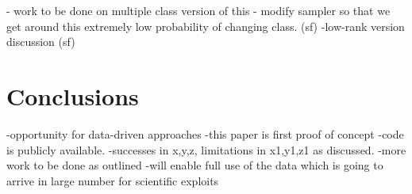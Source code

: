 \documentclass[a4paper,fleqn,usenatbib]{mnras}
\begin{document}
 
 
 


- work to be done on multiple class version of this - modify sampler so that we get around this extremely low probability of changing class. (sf) 
-low-rank version discussion (sf) 


\section{Conclusions}
-opportunity for data-driven approaches
-this paper is first proof of concept
-code is publicly available. 
-successes in x,y,z, limitations in x1,y1,z1 as discussed.
-more work to be done as outlined
-will enable full use of the data which is going to arrive in large number for scientific exploits

\end{document}
